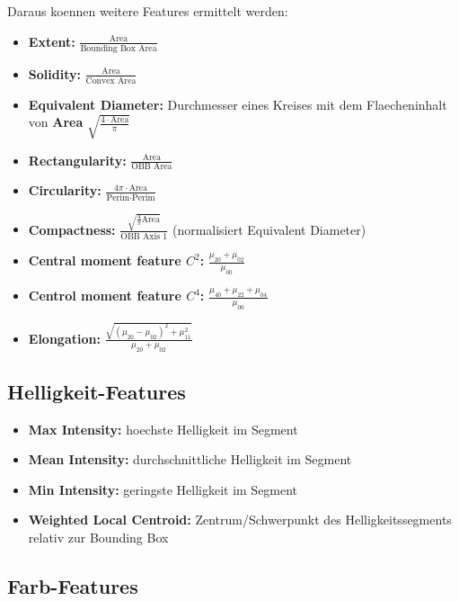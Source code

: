 Daraus koennen weitere Features ermittelt werden:

\begin{itemize}
  \item \textbf{Extent:} $\frac{\text{Area}}{\text{Bounding Box Area}}$
  \item \textbf{Solidity:} $\frac{\text{Area}}{\text{Convex Area}}$
  \item \textbf{Equivalent Diameter:} Durchmesser eines Kreises mit dem Flaecheninhalt von \textbf{Area} $\sqrt{\frac{4 \cdot \text{Area}}{\pi}}$
  \item \textbf{Rectangularity:} $\frac{\text{Area}}{\text{OBB Area}}$
  \item \textbf{Circularity:} $\frac{4\pi \cdot \text{Area}}{\text{Perim} \cdot \text{Perim}}$
  \item \textbf{Compactness:} $\frac{\sqrt{\frac{4}{\pi}\text{Area}}}{\text{OBB Axis 1}}$ (normalisiert Equivalent Diameter)
  \item \textbf{Central moment feature $C^2$:} $\frac{\mu_{20} + \mu_{02}}{\mu_{00}}$ 
  \item \textbf{Centrol moment feature $C^4$:} $\frac{\mu_{40} + \mu_{22} + \mu_{04}}{\mu_{00}}$
  \item \textbf{Elongation:} $\frac{\sqrt{(\mu_{20} - \mu_{02})^2 + \mu^2_{11}}}{\mu_{20} + \mu_{02}}$
\end{itemize}

\subsection{Helligkeit-Features}

\begin{itemize}
  \item \textbf{Max Intensity:} hoechste Helligkeit im Segment
  \item \textbf{Mean Intensity:} durchschnittliche Helligkeit im Segment
  \item \textbf{Min Intensity:} geringste Helligkeit im Segment
  \item \textbf{Weighted Local Centroid:} Zentrum/Schwerpunkt des Helligkeitssegments relativ zur Bounding Box
\end{itemize}

\subsection{Farb-Features}

